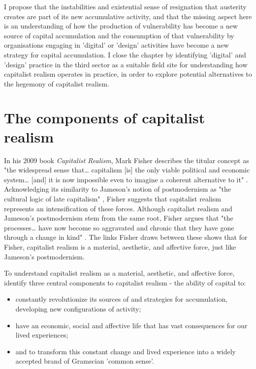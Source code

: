 I propose that the instabilities and existential sense of resignation that austerity creates are part of its new accumulative activity, and that the missing aspect here is an understanding of how the production of vulnerability has become a new source of capital accumulation and the consumption of that vulnerability by organisations engaging in 'digital' or 'design' activities have become a new strategy for capital accumulation. I close the chapter by identifying 'digital' and 'design' practice in the third sector as a suitable field site for understanding how capitalist realism operates in practice, in order to explore potential alternatives to the hegemony of capitalist realism. 

\section{The components of capitalist realism}
\label{2-components}

In his 2009 book \emph{Capitalist Realism}, Mark Fisher describes the titular concept as "the widespread sense that\ldots{} capitalism [is] the only viable political and economic system\ldots{} [and]
it is now impossible even to imagine a coherent alternative to it" \citep[2]{fisher_capitalist_2009}. Acknowledging its similarity to Jameson's notion of postmodernism as "the cultural logic of late capitalism" \cite{JAMESON 1991}, Fisher suggests that capitalist realism represents an intensification of these forces. Although capitalist realism and Jameson's postmodernism stem from the same root, Fisher argues that "the processes\ldots{} have now become so aggravated and chronic that they have gone through a change in kind" \cite[7]{fisher_capitalist_2009}. The links Fisher draws between these shows that for Fisher, capitalist realism is a material, aesthetic, and affective force, just like Jameson's postmodernism. 

To understand capitalist realism as a material, aesthetic, and affective force, \citet[6]{shonkwiler_reading_2014} identify three central components to capitalist realism - the ability of capital to:

\begin{itemize}
\item
  constantly revolutionize its sources of and strategies for
  accumulation, developing new configurations of activity;
\item
  have an economic, social and affective life that has vast consequences
  for our lived experiences;
\item
  and to transform this constant change and lived experience into a
  widely accepted brand of Gramscian 'common sense'.
\end{itemize}


